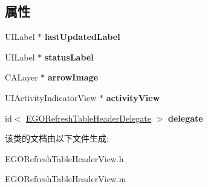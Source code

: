 \subsection*{属性}
\begin{DoxyCompactItemize}
\item 
\hypertarget{interface_e_g_o_refresh_table_header_view_aff6b41496977b54fa89624f638ed0ab9}{U\-I\-Label $\ast$ {\bfseries last\-Updated\-Label}}\label{interface_e_g_o_refresh_table_header_view_aff6b41496977b54fa89624f638ed0ab9}

\item 
\hypertarget{interface_e_g_o_refresh_table_header_view_aebd6c3498e21afd2c0df86a20a981298}{U\-I\-Label $\ast$ {\bfseries status\-Label}}\label{interface_e_g_o_refresh_table_header_view_aebd6c3498e21afd2c0df86a20a981298}

\item 
\hypertarget{interface_e_g_o_refresh_table_header_view_a0793fad79d25582192f37fcf2e3aa925}{C\-A\-Layer $\ast$ {\bfseries arrow\-Image}}\label{interface_e_g_o_refresh_table_header_view_a0793fad79d25582192f37fcf2e3aa925}

\item 
\hypertarget{interface_e_g_o_refresh_table_header_view_aecc4d26af6e45bfc93927ddfd3242149}{U\-I\-Activity\-Indicator\-View $\ast$ {\bfseries activity\-View}}\label{interface_e_g_o_refresh_table_header_view_aecc4d26af6e45bfc93927ddfd3242149}

\item 
\hypertarget{interface_e_g_o_refresh_table_header_view_a0ac65ad5457e9999ecdd6d05a7806d49}{id$<$ \hyperlink{protocol_e_g_o_refresh_table_header_delegate-p}{E\-G\-O\-Refresh\-Table\-Header\-Delegate} $>$ {\bfseries delegate}}\label{interface_e_g_o_refresh_table_header_view_a0ac65ad5457e9999ecdd6d05a7806d49}

\end{DoxyCompactItemize}


该类的文档由以下文件生成\-:\begin{DoxyCompactItemize}
\item 
E\-G\-O\-Refresh\-Table\-Header\-View.\-h\item 
E\-G\-O\-Refresh\-Table\-Header\-View.\-m\end{DoxyCompactItemize}
